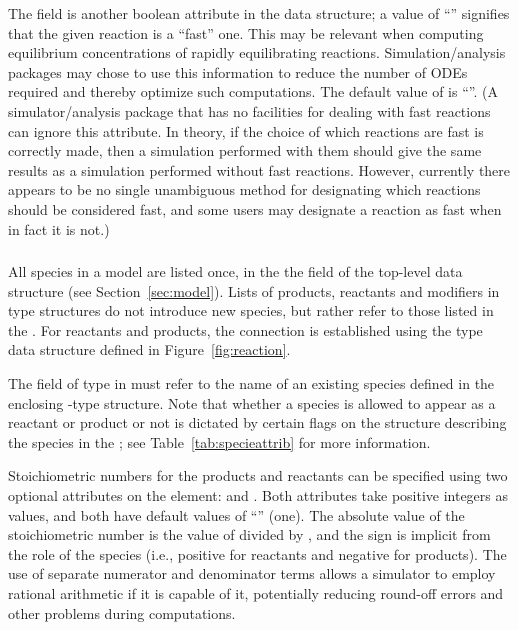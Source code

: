 \documentclass[10pt,twocolumntoc]{cekarticle}
\newcommand{\vref}[1]{\ref{#1}}
\begin{document}
The field  is another boolean attribute in the
 data structure; a value of ``''
signifies that the given reaction is a ``fast'' one.  This may be relevant
when computing equilibrium concentrations of rapidly equilibrating
reactions.  Simulation/analysis packages may chose to use this information
to reduce the number of ODEs required and thereby optimize such
computations.  The default value of  is
``''.  (A simulator/analysis package that has no
facilities for dealing with fast reactions can ignore this attribute. In
theory, if the choice of which reactions are fast is correctly made, then a
simulation performed with them should give the same results as a simulation
performed without fast reactions.  However, currently there appears to be
no single unambiguous method for designating which reactions should be
considered fast, and some users may designate a reaction as fast when in
fact it is not.)

\subsubsection{}
\label{subsec:speciesreference}

All species in a model are listed once, in the the 
field of the top-level  data structure (see
Section~\ref{sec:model}).  Lists of products, reactants and modifiers in
 type structures do not introduce new species, but rather
refer to those listed in the .  For reactants and products,
the connection is established using the  type data
structure defined in Figure~\vref{fig:reaction}.

The field  of type  in 
must refer to the name of an existing species defined in the enclosing
-type structure.  Note that whether a species is allowed to
appear as a reactant or product or not is dictated by certain flags on the
structure describing the species in the ; see
Table~\ref{tab:specieattrib} for more information.

Stoichiometric numbers for the products and reactants can be specified
using two optional attributes on the  element:
 and .  Both attributes take
positive integers as values, and both have default values of ``''
(one).  The absolute value of the stoichiometric number is the value of
 divided by , and the sign is
implicit from the role of the species (i.e., positive for reactants and
negative for products).  The use of separate numerator and denominator
terms allows a simulator to employ rational arithmetic if it is capable of
it, potentially reducing round-off errors and other problems during
computations.
\end{document}
